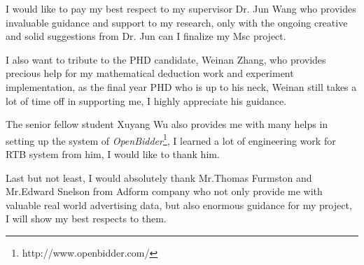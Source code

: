 \begin{acknowledgements}
I would like to pay my best respect to my supervisor Dr. Jun Wang who provides invaluable guidance and support to my research, only with the ongoing creative and solid suggestions from Dr. Jun can I finalize my Msc project.

I also want to tribute to the PHD candidate, Weinan Zhang, who provides precious help for my mathematical deduction work and experiment implementation, as the final year PHD who is up to his neck, Weinan still takes a lot of time off in supporting me, I highly appreciate his guidance.

The senior fellow student Xuyang Wu also provides me with many helps in setting up the system of \textit{OpenBidder}\footnote{http://www.openbidder.com/}, I learned a lot of engineering work for RTB system from him, I would like to thank him.

Last but not least, I would absolutely thank 	
Mr.Thomas Furmston and Mr.Edward Snelson from Adform company who not only provide me with valuable real world advertising data, but also enormous guidance for my project, I will show my best respects to them.
\end{acknowledgements}

\setcounter{tocdepth}{2} 

\tableofcontents
\listoffigures
\listoftables

